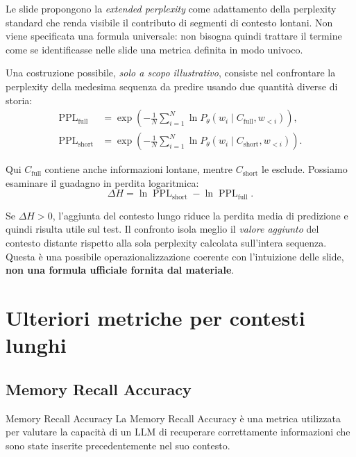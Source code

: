 Le slide propongono la \emph{extended perplexity} come adattamento della perplexity standard che renda visibile il contributo di segmenti di contesto lontani. Non viene specificata una formula universale: non bisogna quindi trattare il termine come se identificasse nelle slide una metrica definita in modo univoco.

Una costruzione possibile, \emph{solo a scopo illustrativo}, consiste nel confrontare la perplexity della medesima sequenza da predire usando due quantità diverse di storia:
\begin{align}
\operatorname{PPL}_{\mathrm{full}}
&=\exp\left(-\frac1N\sum_{i=1}^{N}\ln P_\theta(w_i\mid C_{\mathrm{full}},w_{<i})\right),\\
\operatorname{PPL}_{\mathrm{short}}
&=\exp\left(-\frac1N\sum_{i=1}^{N}\ln P_\theta(w_i\mid C_{\mathrm{short}},w_{<i})\right).
\end{align}

Qui $C_{\mathrm{full}}$ contiene anche informazioni lontane, mentre $C_{\mathrm{short}}$ le esclude. Possiamo esaminare il guadagno in perdita logaritmica:
\begin{equation}
\Delta H=\ln\operatorname{PPL}_{\mathrm{short}}-
\ln\operatorname{PPL}_{\mathrm{full}}.
\end{equation}

Se $\Delta H>0$, l'aggiunta del contesto lungo riduce la perdita media di predizione e quindi risulta utile sul test. Il confronto isola meglio il \emph{valore aggiunto} del contesto distante rispetto alla sola perplexity calcolata sull'intera sequenza. Questa è una possibile operazionalizzazione coerente con l'intuizione delle slide, \textbf{non una formula ufficiale fornita dal materiale}.

\section{Ulteriori metriche per contesti lunghi}

\subsection{Memory Recall Accuracy}

\begin{definition}{Memory Recall Accuracy}
La Memory Recall Accuracy è una metrica utilizzata per valutare la capacità di un LLM di recuperare correttamente informazioni che sono state inserite precedentemente nel suo contesto.
\end{definition}

